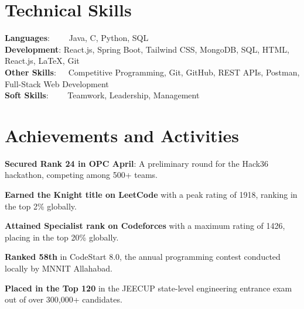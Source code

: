 \documentclass[letterpaper,11pt]{article}
\begin{document}
\section{Technical Skills}
 \begin{itemize}[leftmargin=0.15in, label={}]
    \small{\item{
     \textbf{Languages}{:~~~~ Java, C, Python, SQL} \\ \vspace{2pt}
     \textbf{Development}{: React.js, Spring Boot,  Tailwind CSS, MongoDB, SQL, HTML, React.js, LaTeX, Git} \\ \vspace{2pt}
     \textbf{Other Skills}{:~~~Competitive Programming, Git, GitHub, REST APIs, Postman, Full-Stack Web Development} \\ \vspace{2pt}
     \textbf{Soft Skills}{:~~~~ Teamwork, Leadership, Management} \\
    }}
 \end{itemize}
 \vspace{-15pt}


\section{Achievements and Activities}
\begin{itemize}[leftmargin=0.15in, label={$\vcenter{\hbox{\tiny$\bullet$}}$}, itemsep=-2pt] 
    \small{\item{\textbf{Secured Rank 24 in OPC April}: A preliminary round for the Hack36 hackathon, competing among 500+ teams.}}
    \small{\item{\textbf{Earned the Knight title on LeetCode} with a peak rating of 1918, ranking in the top 2\% globally.}}
    \small{\item{\textbf{Attained Specialist rank on Codeforces} with a maximum rating of 1426, placing in the top 20\% globally.}}
    \small{\item{\textbf{Ranked 58th} in CodeStart 8.0, the annual programming contest conducted locally by MNNIT Allahabad.}}
    \small{\item{\textbf{Placed in the Top 120} in the JEECUP state-level engineering entrance exam out of over 300,000+ candidates.}}
\end{itemize}
\vspace{-8pt}
\end{document}
